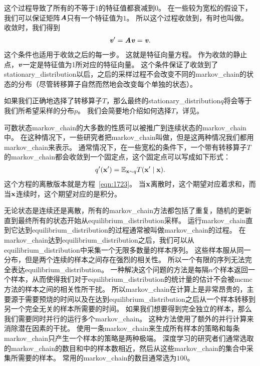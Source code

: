 这个过程导致了所有的不等于$1$的特征值都衰减到$0$。
在一些较为宽松的假设下，我们可以保证矩阵$\boldsymbol{\mathit{A}}$只有一个特征值为$1$。
所以这个过程收敛到，有时也叫做。
收敛时，我们得到
\begin{align}
\label{eqn:1723}
\boldsymbol{\mathit{v}} ' = \boldsymbol{\mathit{A}} \boldsymbol{\mathit{v}} = \boldsymbol{\mathit{v}} .
\end{align}
这个条件也适用于收敛之后的每一步。
这就是特征向量方程。
作为收敛的静止点，$\boldsymbol{\mathit{v}}$一定是特征值为1所对应的特征向量。
这个条件保证了收敛到了\gls{stationary_distribution}以后，之后的采样过程不会改变不同的\gls{markov_chain}的状态的分布（尽管转移算子自然而然地会改变每个单独的状态）。

如果我们正确地选择了转移算子$T$，那么最终的\gls{stationary_distribution}$q$将会等于我们所希望采样的分布$p$。
我们会简要地介绍如何选择$T$，详见。


可数状态\gls{markov_chain}的大多数的性质可以被推广到连续状态的\gls{markov_chain}中。
在这种情况下，一些研究者把\gls{markov_chain}叫做，但是这两种情况我们都用\gls{markov_chain}来表示。
通常情况下，在一些宽松的条件下，一个带有转移算子$T$的\gls{markov_chain}都会收敛到一个固定点，这个固定点可以写成如下形式：
\begin{align}
q' (\mathbf{x}') = \mathbb{E}_{\mathbf{x}\sim q}T(\mathbf{x}'\mid \mathbf{x}).
\end{align}
这个方程的离散版本就是方程~\eqref{eqn:1723}。	
当$\mathbf{x}$离散时，这个期望对应着求和，而当$\mathbf{x}$连续时，这个期望对应的是积分。



无论状态是连续还是离散，所有的\gls{markov_chain}方法都包括了重复，随机的更新直到最终所有的状态开始从\gls{equilibrium_distribution}采样。
运行\gls{markov_chain}直到它达到\gls{equilibrium_distribution}的过程通常被叫做\gls{markov_chain}的过程。
在\gls{markov_chain}达到\gls{equilibrium_distribution}之后，我们可以从\gls{equilibrium_distribution}中采集一个无限多数量的样本序列。
这些样本服从同一分布，但是两个连续的样本之间存在强烈的相关性。
所以一个有限的序列无法完全表达\gls{equilibrium_distribution}。
一种解决这个问题的方法是每隔$n$个样本返回一个样本，从而使得我们对于\gls{equilibrium_distribution}的统计量的估计不会被\gls{mcmc}方法的样本之间的相关性所干扰。
所以\gls{markov_chain}在计算上是非常昂贵的，主要源于需要预烧的时间以及在达到\gls{equilibrium_distribution}之后从一个样本转移到另一个完全无关的样本所需要的时间。
如果我们想要得到完全独立的样本，那么我们需要同时并行的运行多个\gls{markov_chain}。
这种方法使用了额外的并行计算来消除潜在因素的干扰。
使用一条\gls{markov_chain}来生成所有样本的策略和每条\gls{markov_chain}只产生一个样本的策略是两种极端。
深度学习的研究者们通常选取的\gls{markov_chain}的数目和中的样本数相近，然后从这些\gls{markov_chain}的集合中采集所需要的样本。
常用的\gls{markov_chain}的数目通常选为$100$。


